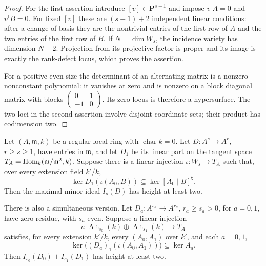\begin{proof}
For the first assertion introduce $[v]\in\mathbf P^{s-1}$ and
impose $v^{\mathsf t}A=0$ and $v^{\mathsf t}B=0$.  For fixed $[v]$
these are $(s-1)+2$ independent linear conditions: after a change
of basis they are the nontrivial entries of the first row of $A$
and the two entries of the first row of $B$.  If $N=\dim W_s$,
the incidence variety has dimension $N-2$.  Projection from its
projective factor is proper and its image is exactly the
rank-defect locus, which proves the assertion.

For a positive even size the determinant of an alternating matrix
is a nonzero nonconstant polynomial: it vanishes at zero and is
nonzero on a block diagonal matrix with blocks
$\left(\begin{smallmatrix}0&1\\-1&0\end{smallmatrix}\right)$.
Its zero locus is therefore a hypersurface.  The two loci in the
second assertion involve disjoint coordinate sets; their product
has codimension two.
\end{proof}

\begin{lemma}\label{unit:tangent-minors}
Let $(A,\mathfrak m,k)$ be a regular local ring with
$\operatorname{char}k=0$.  Let $D:A^s\to A^r$, $r\geq s\geq1$,
have entries in $\mathfrak m$, and let $D_1$ be its linear part on
the tangent space $T_A=\operatorname{Hom}_k(\mathfrak m/\mathfrak m^2,k)$.
Suppose there is a linear injection $\iota:W_s\to T_A$ such that,
over every extension field $k'/k$,
\[
 \ker D_1(\iota(A_0,B))
       \subseteq\ker[A_0\mid B]^{\mathsf t}.
\]
Then the maximal-minor ideal $I_s(D)$ has height at least two.

There is also a simultaneous version.  Let $D_a:A^{s_a}\to A^{r_a}$,
$r_a\geq s_a>0$, for $a=0,1$, have zero residue, with $s_a$ even.
Suppose a linear injection
\[
 \iota:\operatorname{Alt}_{s_0}(k)\oplus
            \operatorname{Alt}_{s_1}(k)\longrightarrow T_A
\]
satisfies, for every extension $k'/k$, every $(A_0,A_1)$ over
$k'$, and each $a=0,1$,
\[
 \ker\bigl((D_a)_1(\iota(A_0,A_1))\bigr)\subseteq\ker A_a.
\]
Then $I_{s_0}(D_0)+I_{s_1}(D_1)$ has height at least two.
\end{lemma}

